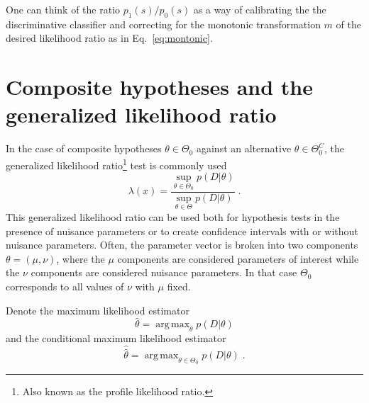 \documentclass[11pt, oneside]{article}   	%
\DeclareMathOperator*{\argmax}{arg\,max}
\begin{document}
One can think of the ratio $p_1(s)/p_0(s)$ as a way of calibrating the the discriminative classifier and correcting for the monotonic transformation $m$ of the desired likelihood ratio as in Eq.~\ref{eq:montonic}.




\section{Composite hypotheses and the generalized likelihood ratio}\label{S:GLR}

In the case of composite hypotheses $\theta \in \Theta_0$ against an alternative $\theta \in \Theta_0^C$, the generalized likelihood ratio\footnote{Also known as the profile likelihood ratio.} test is commonly used
\begin{equation}
\lambda(x) =  \frac{ \sup_{\theta \in \Theta_0} p(D | \theta)}{ \sup_{\theta \in \Theta} p(D | \theta)} \; .
\end{equation}
This generalized likelihood ratio can be used both for hypothesis tests in the presence of nuisance parameters or to create confidence intervals with or without nuisance parameters.  Often, the parameter vector is broken into two components $\theta=(\mu,\nu)$, where the $\mu$ components are considered parameters of interest while the $\nu$ components are considered nuisance parameters. In that case $\Theta_0$ corresponds to all values of $\nu$ with $\mu$ fixed.

Denote the maximum likelihood estimator
\begin{equation}\label{eq:mle}
\hat{\theta} = \argmax_\theta  p(D | \theta)
\end{equation}
and the conditional maximum likelihood estimator
\begin{equation}
\hat{\hat{\theta}} = \argmax_{\theta \in \Theta_0}  p(D | \theta) \; .
\end{equation}
\end{document}

